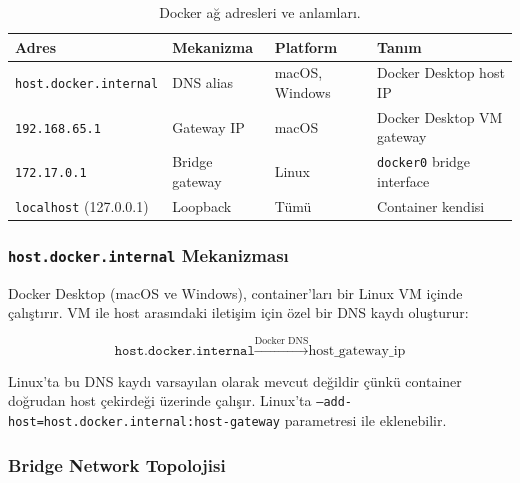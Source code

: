\begin{table}[H]
\centering
\caption{Docker a\u{g} adresleri ve anlamlar{\i}.}
\label{tab:docker-network}
\begin{tabular}{llll}
\toprule
\textbf{Adres} & \textbf{Mekanizma} & \textbf{Platform} & \textbf{Tan{\i}m} \\
\midrule
\texttt{host.docker.internal} & DNS alias & macOS, Windows & Docker Desktop host IP \\
\texttt{192.168.65.1} & Gateway IP & macOS & Docker Desktop VM gateway \\
\texttt{172.17.0.1} & Bridge gateway & Linux & \texttt{docker0} bridge interface \\
\texttt{localhost} (127.0.0.1) & Loopback & T\"{u}m\"{u} & Container kendisi \\
\bottomrule
\end{tabular}
\end{table}

\subsubsection{\texttt{host.docker.internal} Mekanizmas{\i}}

Docker Desktop (macOS ve Windows), container'lar{\i} bir Linux VM i\c{c}inde \c{c}al{\i}\c{s}t{\i}r{\i}r. VM ile host aras{\i}ndaki ileti\c{s}im i\c{c}in \"{o}zel bir DNS kayd{\i} olu\c{s}turur:

\begin{equation}
\texttt{host.docker.internal} \xrightarrow{\text{Docker DNS}} \text{host\_gateway\_ip}
\end{equation}

Linux'ta bu DNS kayd{\i} varsay{\i}lan olarak mevcut de\u{g}ildir \c{c}\"{u}nk\"{u} container do\u{g}rudan host \c{c}ekirde\u{g}i \"{u}zerinde \c{c}al{\i}\c{s}{\i}r. Linux'ta \texttt{--add-host=host.docker.internal:host-gateway} parametresi ile eklenebilir.

\subsubsection{Bridge Network Topolojisi}


